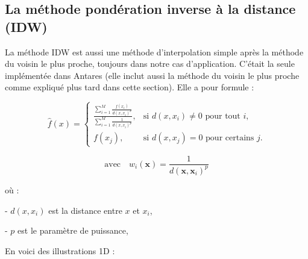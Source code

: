 \subsection{La méthode pondération inverse à la distance (IDW)}\label{sIDW} %

La méthode IDW est aussi une méthode d'interpolation simple après la méthode du voisin le plus proche, toujours dans notre cas d'application. C'était la seule implémentée dans Antares (elle inclut aussi la méthode du voisin le plus proche comme expliqué plus tard dans cette section). Elle a pour formule :

\begin{equation}
    \hat{f}(x) = 
    \begin{cases}
    \frac{\sum_{i=1}^{M} \frac{f(x_i)}{d(x, x_i)^p}}{\sum_{i=1}^{M} \frac{1}{d(x, x_i)^p}}, & \text{si } d(x, x_i) \neq 0 \text{ pour tout } i, \\ 
    f(x_j), & \text{si } d(x, x_j) = 0 \text{ pour certains } j.
    \end{cases}
\end{equation}


\[
\text{avec} \quad w_i(\mathbf{x}) = \frac{1}{d(\mathbf{x}, \mathbf{x}_i)^p}
\]


où :





- \(d(x, x_i)\) est la distance entre \(x\) et \(x_i\),

\vspace{-0,2 cm}

- \(p\) est le paramètre de puissance,

\vspace{-0,2 cm}




En voici des illustrations 1D :

